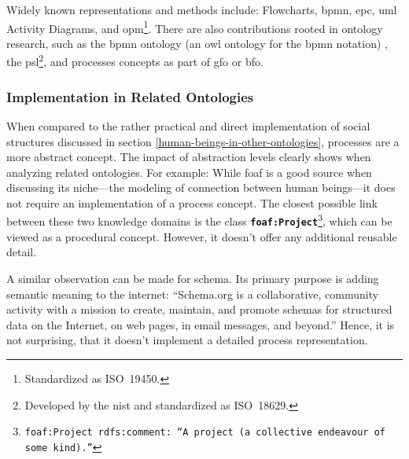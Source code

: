 \documentclass[a4paper, DIV=13, BCOR=0cm]{scrbook}
\newcommand{\class}[1]{\texttt{\textbf{#1}}}
\newcommand{\foottt}[1]{\footnote{\texttt{#1}}}
\begin{document}
Widely known representations and methods include: Flowcharts, \gls{bpmn}, \gls{epc}, \gls{uml} Activity Diagrams, and \gls{opm}\footnote{Standardized as ISO~19450.}. There are also contributions rooted in ontology research, such as the \gls{bpmn} ontology (an \gls{owl} ontology for the \gls{bpmn} notation) \cite{2014foisbpmn}, the \gls{psl}\footnote{Developed by the \gls{nist} and standardized as ISO~18629.}, and processes concepts as part of \gls{gfo} or \gls{bfo}.

\subsubsection{Implementation in Related Ontologies }
When compared to the rather practical and direct implementation of social structures discussed in section \ref{human-beings-in-other-ontologies}, processes are a more abstract concept. The impact of abstraction levels clearly shows when analyzing related ontologies. For example: While \gls{foaf} is a good source when discussing its niche---the modeling of connection between human beings---it does not require an implementation of a process concept. The closest possible link between these two knowledge domains is the  class \class{foaf:Project}\foottt{foaf:Project rdfs:comment: \enquote{A project (a collective endeavour of some kind).}}, which can be viewed as a procedural concept. However, it doesn't offer any additional reusable detail.

A similar observation can be made for \gls{schema}. Its primary purpose is adding semantic meaning to the internet: \enquote{Schema.org is a collaborative, community activity with a mission to create, maintain, and promote schemas for structured data on the Internet, on web pages, in email messages, and beyond.} \cite{schema-mission} Hence, it is not surprising, that it doesn't implement a detailed process representation.
\end{document}
